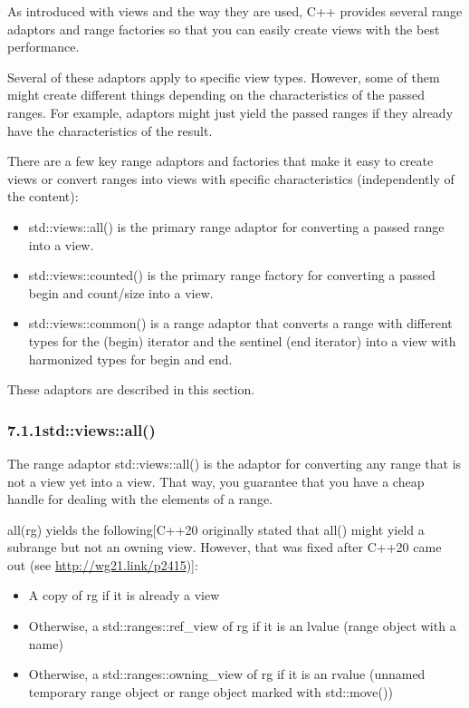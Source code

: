 
As introduced with views and the way they are used, C++ provides several range adaptors and range factories so that you can easily create views with the best performance.

Several of these adaptors apply to specific view types. However, some of them might create different things depending on the characteristics of the passed ranges. For example, adaptors might just yield the passed ranges if they already have the characteristics of the result.

There are a few key range adaptors and factories that make it easy to create views or convert ranges into views with specific characteristics (independently of the content):

\begin{itemize}
\item
std::views::all() is the primary range adaptor for converting a passed range into a view.

\item
std::views::counted() is the primary range factory for converting a passed begin and count/size into a view.

\item
std::views::common() is a range adaptor that converts a range with different types for the (begin) iterator and the sentinel (end iterator) into a view with harmonized types for begin and end.
\end{itemize}

These adaptors are described in this section.

\subsubsection*{ 7.1.1\hspace{0.2cm}std::views::all()}

The range adaptor std::views::all() is the adaptor for converting any range that is not a view yet into a view. That way, you guarantee that you have a cheap handle for dealing with the elements of a range.

all(rg) yields the following[C++20 originally stated that all() might yield a subrange but not an owning view. However, that was fixed after C++20 came out (see \url{http://wg21.link/p2415})]:

\begin{itemize}
\item
A copy of rg if it is already a view

\item
Otherwise, a std::ranges::ref\_view of rg if it is an lvalue (range object with a name)

\item
Otherwise, a std::ranges::owning\_view of rg if it is an rvalue (unnamed temporary range object or range object marked with std::move())
\end{itemize}

